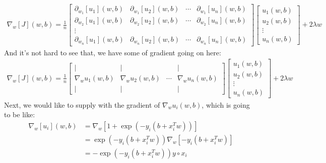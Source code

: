\documentclass[]{article}
\begin{document}
        \begin{align*}\tag{A.6.a.3.1}\label{eqn:A.6.a.3.1}
            \nabla_w[J](w, b) = 
            \frac{1}{n} \begin{bmatrix}
               \partial_{w_1}[u_1](w, b) & \partial_{w_1}[u_2](w, b) & \cdots &\partial_{w_1}[u_n](w, b)
               \\
               \partial_{w_2}[u_1](w, b) & \partial_{w_2}[u_2](w, b) & \cdots &\partial_{w_2}[u_n](w, b)
               \\
               \vdots 
               \\
               \partial_{w_n}[u_1](w, b) & \partial_{w_n}[u_2](w, b) & \cdots &\partial_{w_n}[u_n](w, b)
            \end{bmatrix}
            \begin{bmatrix}
                u_1(w, b) \\ 
                u_2(w, b) \\
                \vdots
                \\
                u_n(w, b)
            \end{bmatrix}
            + 2\lambda w
        \end{align*}
        And it's not hard to see that, we have some of gradient going on here: 
        \begin{align*}\tag{A.6.a.3.2}\label{eqn:A.6.a.3.2}
            \nabla_w[J](w, b) = 
            \frac{1}{n} \begin{bmatrix}
               | & | & &|
               \\
               \nabla_w u_1(w, b) & \nabla_w u_2(w, b) & \cdots & \nabla_w u_n(w, b)
               \\
               | & | & &|
            \end{bmatrix}
            \begin{bmatrix}
                u_1(w, b) \\ 
                u_2(w, b) \\
                \vdots
                \\
                u_n(w, b)
            \end{bmatrix}
            + 2\lambda w
        \end{align*}
        Next, we would like to supply with the gradient of $\nabla_w u_i(w, b)$, which is going to be like: 
        \begin{align*}\tag{6.a.3.3}\label{eqn:6.a.3.3}
            \nabla_{w}[u_i](w, b) 
            &= 
            \nabla_{w} \left[
                1 + \exp(-y_i(b + x_i^Tw))
            \right]
            \\
            &= 
            \exp(-y_i(b + x_i^Tw))\nabla_{w}\left[
                -y_i(b + x_i^Tw)
            \right]
            \\
            &=-\exp(-y_i(b + x_i^Tw))y\circ x_i
        \end{align*}
\end{document}
